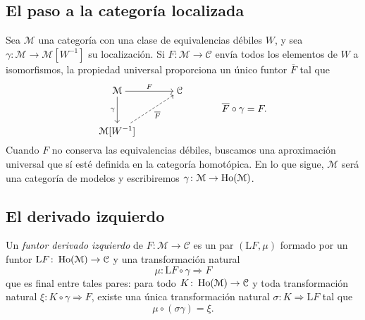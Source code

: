 \subsection{El paso a la categoría localizada}

Sea $\mathcal M$ una categoría con una clase de equivalencias débiles $W$, y sea $\gamma\colon\mathcal M\to\mathcal M[W^{-1}]$ su localización. Si $F\colon\mathcal M\to\mathcal C$ envía todos los elementos de $W$ a isomorfismos, la propiedad universal proporciona un único funtor $\overline F$ tal que
\[
\begin{tikzcd}[cramped,column sep=large,row sep=large]
\mathcal M \arrow[r,"F"] \arrow[d,"\gamma"'] & \mathcal C\\
\mathcal M[W^{-1}] \arrow[ur,dashed,"\overline F"'] &
\end{tikzcd}
\qquad\qquad \overline F\circ\gamma=F.
\]
Cuando $F$ no conserva las equivalencias débiles, buscamos una aproximación universal que sí esté definida en la categoría homotópica. En lo que sigue, $\mathcal M$ será una categoría de modelos y escribiremos $\gamma\colon\mathcal M\to\operatorname{Ho}(\mathcal M)$.

\subsection{El derivado izquierdo}

\begin{defi}\label{defi:c13-derivado-izquierdo}
Un \emph{funtor derivado izquierdo} de $F\colon\mathcal M\to\mathcal C$ es un par $(\mathrm LF,\mu)$ formado por un funtor $\mathrm LF\colon\operatorname{Ho}(\mathcal M)\to\mathcal C$ y una transformación natural
\[
\mu\colon\mathrm LF\circ\gamma\Longrightarrow F
\]
que es final entre tales pares: para todo $K\colon\operatorname{Ho}(\mathcal M)\to\mathcal C$ y toda transformación natural $\xi\colon K\circ\gamma\Rightarrow F$, existe una única transformación natural $\sigma\colon K\Rightarrow\mathrm LF$ tal que
\[
\mu\circ(\sigma\gamma)=\xi.
\]
\end{defi}

